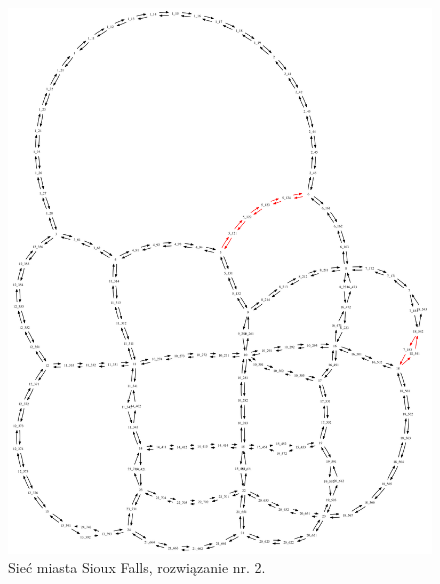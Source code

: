 \documentclass[twoside,12pt]{report}
\begin{document}
\begin{figure}[ht]
\centering
\includegraphics[totalheight=0.580\textheight, angle=90]{img/sioux-out/2/network2}
\caption{Sieć miasta Sioux Falls, rozwiązanie nr. 2.}
\label{sioux2}
\end{figure}
\end{document}
